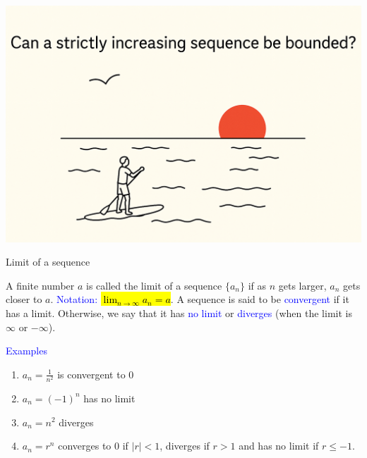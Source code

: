 \documentclass[11pt,aspectratio=169]{beamer}
\begin{document}
{
\begin{frame}[plain]
\noindent
\includegraphics[scale=.25]{vbreaks/question1.png}
\end{frame}
}


\begin{frame}{Limit of a sequence}


 A finite number $a$ is called the \alert{limit} of a sequence $\{a_n\}$ if as $n$ gets larger, $a_n$ gets closer to $a$. \textcolor{blue}{Notation:} \hl{$\lim_{n \rightarrow \infty} a_n=a$}.
\vskip 12pt
A sequence is said to be \textcolor{blue}{convergent} if it has a limit. Otherwise, we say that it has \textcolor{blue}{no limit} or  \textcolor{blue}{diverges} (when the limit is $\infty$ or $-\infty$).

\vskip 12pt
\textcolor{blue}{Examples} 
\begin{enumerate}
\item $a_n=\frac{1}{n^2}$ is convergent to 0

\item $a_n=(-1)^n$ has no limit

\item $a_n=n^2$ diverges

\item $a_n=r^n$ converges to $0$ if  $\vert r \vert <1$, diverges if $r>1$ and has no limit if $r\leq -1$.

\end{enumerate}

 \end{frame}
\end{document}
